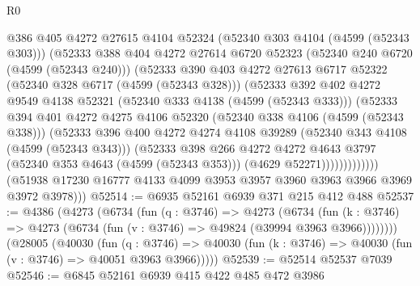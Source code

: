 \begin{lexlean}{R0}
\begin{coremodule}
                    @386
                    @405
                    @4272
                    @27615
                    @4104
                    @52324
                    (@52340 @303 @4104 (@4599 (@52343 @303)))
                    (@52333
                      @388
                      @404
                      @4272
                      @27614
                      @6720
                      @52323
                      (@52340 @240 @6720 (@4599 (@52343 @240)))
                      (@52333
                        @390
                        @403
                        @4272
                        @27613
                        @6717
                        @52322
                        (@52340 @328 @6717 (@4599 (@52343 @328)))
                        (@52333
                          @392
                          @402
                          @4272
                          @9549
                          @4138
                          @52321
                          (@52340 @333 @4138 (@4599 (@52343 @333)))
                          (@52333
                            @394
                            @401
                            @4272
                            @4275
                            @4106
                            @52320
                            (@52340 @338 @4106 (@4599 (@52343 @338)))
                            (@52333
                              @396
                              @400
                              @4272
                              @4274
                              @4108
                              @39289
                              (@52340 @343 @4108 (@4599 (@52343 @343)))
                              (@52333
                                @398
                                @266
                                @4272
                                @4272
                                @4643
                                @3797
                                (@52340 @353 @4643 (@4599 (@52343 @353)))
                                (@4629 @52271)))))))))))))
        (@51938 @17230 @16777 @4133 @4099 @3953 @3957 @3960 @3963 @3966 @3969 @3972 @3978)))
@52514 := @6935 @52161 @6939 @371 @215 @412 @488
@52537 := @4386
    (@4273
      (@6734
        (fun (q : @3746) =>
        @4273
          (@6734
            (fun (k : @3746) => @4273 (@6734 (fun (v : @3746) => @49824 (@39994 @3963 @3966))))))))
    (@28005
      (@40030
        (fun (q : @3746) =>
        @40030 (fun (k : @3746) => @40030 (fun (v : @3746) => @40051 @3963 @3966)))))
@52539 := @52514 @52537 @7039
@52546 := @6845 @52161 @6939 @415 @422 @485 @472 @3986

\end{coremodule}
\end{lexlean}
